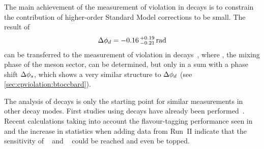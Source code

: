 The main achievement of the measurement of \CP violation in \BdToDD decays is
to constrain the contribution of higher-order Standard Model corrections to be
small. The result of
\begin{align*}
	\Delta {\ensuremath{\phi_{{d}}}} = -0.16\,^{+0.19}_{-0.21}\,\si{\radian}
\end{align*}
can be transferred to the measurement of \CP violation in \BsToDsDs
decays~\cite{LHCb-PAPER-2014-051}, where \phis, the mixing phase of the \Bs
meson sector, can be determined, but only in a sum with a phase shift $\Delta
{\ensuremath{\phi_{{s}}}}$, which shows a very similar structure to $\Delta {\ensuremath{\phi_{{d}}}}$ (see
\cref{sec:cpviolation:btoccbard}).

The analysis of \BdToDD decays is only the starting point for similar
measurements in other \allBToDD decay modes. First studies using \BdToDstD
decays have already been performed~\cite{BToDstDthesis}. Recent calculations
taking into account the flavour-tagging performance seen in \BdToDD and the
increase in statistics when adding data from Run~II indicate that the
sensitivity of \babar~\cite{Aubert:2008ah} and \belle~\cite{Rohrken:2012ta}
could be reached and even be topped.

